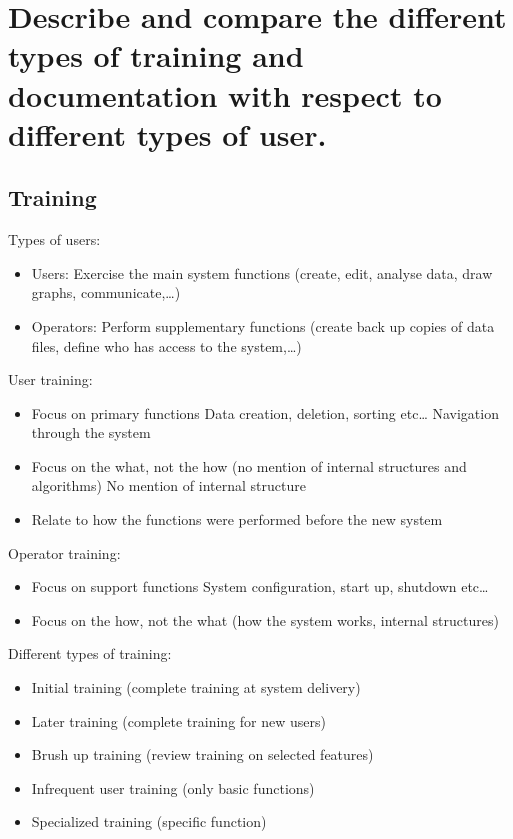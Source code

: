 \clearpage{}
\section{Describe and compare the different types of training and
documentation with respect to different types of user.}


\subsection{Training}

Types of users:

\begin{itemize}
    \item Users: Exercise the main system functions (create, edit, analyse data, draw graphs, communicate,\ldots)
    \item Operators: Perform supplementary functions (create back up copies of data files, define who has access to the system,\ldots)
\end{itemize}

User training:

\begin{itemize}
    \item Focus on primary functions
        \subitem{} Data creation, deletion, sorting etc\ldots
        \subitem{} Navigation through the system
    \item Focus on the what, not the how (no mention of internal structures and algorithms)
        \subitem{} No mention of internal structure
    \item Relate to how the functions were performed before the new system
\end{itemize}

Operator training:

\begin{itemize}
    \item Focus on support functions
        \subitem{} System configuration, start up, shutdown etc\ldots
    \item Focus on the how, not the what (how the system works, internal structures)
\end{itemize}

Different types of training:

\begin{itemize}
    \item Initial training (complete training at system delivery)
    \item Later training (complete training for new users)
    \item Brush up training (review training on selected features)
    \item Infrequent user training (only basic functions)
    \item Specialized training (specific function)
\end{itemize}


